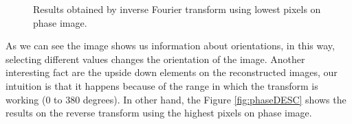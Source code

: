 \documentclass[12pt,a4paper]{article}
\begin{document}
\begin{figure}[!h]
	\quad
	
	\caption{Results obtained by inverse Fourier transform using lowest pixels on phase image.}
	\label{fig:phaseINC}
\end{figure} 

As we can see the image shows us information about orientations, in this way, selecting different values changes the orientation of the image. Another interesting fact are the upside down elements on the reconstructed images, our intuition is that it happens because of the range in which the transform is working (0 to 380 degrees). In other hand, the Figure \ref{fig:phaseDESC} shows the results on the reverse transform using the highest pixels on phase image. \\
\end{document}
